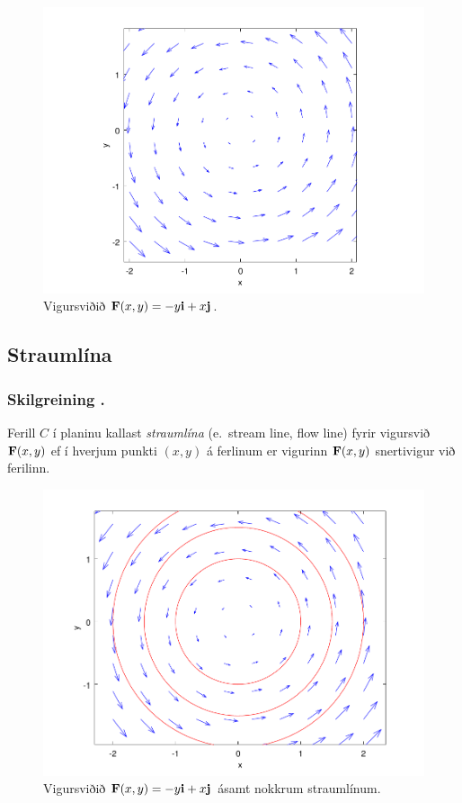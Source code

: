  \begin {figure}[h!]
 \centering
            \includegraphics[width=0.75\linewidth]{vfield}
            \caption*{ Vigursviðið $\mathbf{F}(x,y) = -y\mbox{${\bf i}$} + x \mbox{${\bf j}$}$.}
\end {figure}






\subsection{Straumlína} 

\subsubsection{Skilgreining \kaflanr.}
 Ferill $C$ í planinu kallast {\em straumlína}
(e.~stream line, flow line)
fyrir vigursvið $\mbox{${\bf F}$}(x,y)$ ef í hverjum punkti $(x,y)$ á ferlinum er
vigurinn $\mbox{${\bf F}$}(x,y)$ snertivigur við ferilinn. 


 \begin {figure}[h!]
 \centering
            \includegraphics[width=0.55\linewidth]{flowlines}
            \caption*{ Vigursviðið $\mathbf{F}(x,y) = -y\mbox{${\bf i}$} + x \mbox{${\bf j}$}$ ásamt nokkrum straumlínum.}
\end {figure}




